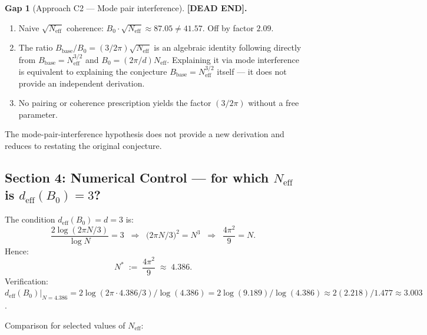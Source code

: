 \documentclass[11pt,a4paper]{article}
\theoremstyle{definition}
\newtheorem{gap}{Gap}
\theoremstyle{remark}
\begin{document}
\begin{gap}[Approach C2 — Mode pair interference]
\label{gap:C2}
  \textbf{[DEAD END].}
  \begin{enumerate}
    \item[(i)] Naive $\sqrt{N_{\mathrm{eff}}}$ coherence:
      $B_0 \cdot \sqrt{N_{\mathrm{eff}}} \approx 87.05 \ne 41.57$.
      Off by factor $2.09$.
    \item[(ii)] The ratio $B_{\mathrm{base}}/B_0 = (3/2\pi)\sqrt{N_{\mathrm{eff}}}$
      is an algebraic identity following directly from $B_{\mathrm{base}} = N_{\mathrm{eff}}^{3/2}$
      and $B_0 = (2\pi/d)N_{\mathrm{eff}}$.
      Explaining it via mode interference is equivalent to explaining the conjecture
      $B_{\mathrm{base}} = N_{\mathrm{eff}}^{3/2}$ itself — it does not provide an independent derivation.
    \item[(iii)] No pairing or coherence prescription yields the factor $(3/2\pi)$
      without a free parameter.
  \end{enumerate}
  The mode-pair-interference hypothesis does not provide a new derivation
  and reduces to restating the original conjecture.
\end{gap}

\subsection{Section 4: Numerical Control — for which $N_{\mathrm{eff}}$ is $d_{\mathrm{eff}}(B_0) = 3$?}
\label{sec:numerical_control}

The condition $d_{\mathrm{eff}}(B_0) = d = 3$ is:
\begin{equation}
  \frac{2\log(2\pi N/3)}{\log N} = 3
  \;\;\Longrightarrow\;\;
  \bigl(2\pi N/3\bigr)^2 = N^3
  \;\;\Longrightarrow\;\;
  \frac{4\pi^2}{9} = N.
  \label{eq:N_star_condition}
\end{equation}
Hence:
\begin{equation}
  N^* \;:=\; \frac{4\pi^2}{9} \;\approx\; 4.386.
  \label{eq:N_star_value}
\end{equation}
Verification: $d_{\mathrm{eff}}(B_0)\big|_{N=4.386}
= 2\log(2\pi\cdot 4.386/3)/\log(4.386)
= 2\log(9.189)/\log(4.386)
\approx 2(2.218)/1.477 \approx 3.003$. \checkmark

\medskip
\noindent
Comparison for selected values of $N_{\mathrm{eff}}$:
\end{document}
